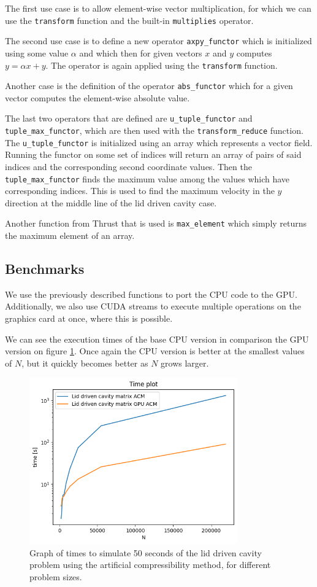 \documentclass{article}
\begin{document}
The first use case is to allow element-wise vector multiplication, for which we can use 
the \verb|transform| function and the built-in \verb|multiplies| operator.

The second use case is to define a new operator \verb|axpy_functor| which is initialized using some 
value \(\alpha\) and which then for given vectors \(x\) and \(y\) computes \(y = \alpha x + y\).
The operator is again applied using the \verb|transform| function.

Another case is the definition of the operator \verb|abs_functor| which for a given vector 
computes the element-wise absolute value.

The last two operators that are defined are \verb|u_tuple_functor| and \verb|tuple_max_functor|,
which are then used with the \verb|transform_reduce| function. The \verb|u_tuple_functor| is initialized
using an array which represents a vector field. Running the functor on some set of indices
will return an array of pairs of said indices and the corresponding second coordinate values.
Then the \verb|tuple_max_functor| finds the maximum value among the values which have corresponding 
indices. This is used to find 
the maximum velocity in the \(y\) direction at the middle line of the lid driven cavity case.

Another function from Thrust that is used is \verb|max_element| which simply returns the 
maximum element of an array.
\subsection{Benchmarks}
We use the previously described functions to port the CPU code to the GPU. Additionally,
we also use CUDA streams to execute multiple operations on the graphics card at once, where 
this is possible. 

We can see the execution times of the base CPU version in comparison the GPU version on figure 
\ref{fig:lidDrivenACM_time}.
Once again the CPU version is better at the smallest values of \(N\), but it quickly becomes 
better as \(N\) grows larger.
\begin{figure}[h!] 
    \centering 
    \includegraphics[width=0.8\textwidth]{plots/lidDrivenACM_time.png} 
    \caption{Graph of times to simulate 50 seconds of the lid driven cavity problem using
    the artificial compressibility method, for different problem sizes.} 
    \label{fig:lidDrivenACM_time} 
\end{figure}
\end{document}
